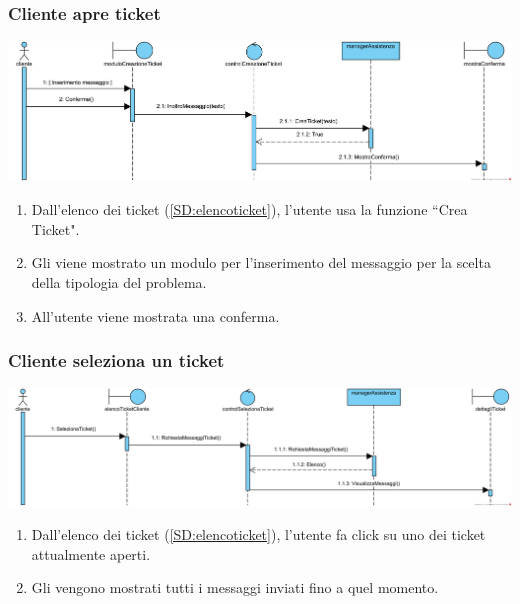 \documentclass[12pt]{article}
\begin{document}
\subsubsection{Cliente apre ticket}
\label{SD:aperturaticket}

\begin{center}
\includegraphics[clip,width=\textwidth]{SequenceDiagram/ClienteTicketCreazione}
\end{center}

\begin{enumerate}
\item Dall'elenco dei ticket (\ref{SD:elencoticket}), l'utente usa la funzione ``Crea Ticket".
\item Gli viene mostrato un modulo per l'inserimento del messaggio per la scelta della tipologia del problema.
\item All'utente viene mostrata una conferma.
\end{enumerate}

\subsubsection{Cliente seleziona un ticket}
\label{SD:selezioneticketcliente}

\begin{center}
\includegraphics[width=\textwidth]{SequenceDiagram/ClienteTicketSeleziona}
\end{center}

\begin{enumerate}
\item Dall'elenco dei ticket (\ref{SD:elencoticket}), l'utente fa click su uno dei ticket attualmente aperti.
\item Gli vengono mostrati tutti i messaggi inviati fino a quel momento.
\end{enumerate}
\end{document}
